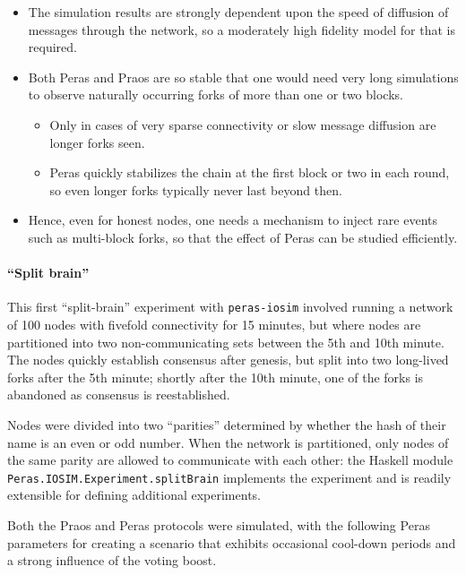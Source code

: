 \documentclass[10pt]{article}
\providecommand{\tightlist}{%
  \setlength{\itemsep}{0pt}\setlength{\parskip}{0pt}}
\begin{document}
\begin{itemize}
\tightlist
\item
  The simulation results are strongly dependent upon the speed of
  diffusion of messages through the network, so a moderately high
  fidelity model for that is required.
\item
  Both Peras and Praos are so stable that one would need very long
  simulations to observe naturally occurring forks of more than one or
  two blocks.

  \begin{itemize}
  \tightlist
  \item
    Only in cases of very sparse connectivity or slow message diffusion
    are longer forks seen.
  \item
    Peras quickly stabilizes the chain at the first block or two in each
    round, so even longer forks typically never last beyond then.
  \end{itemize}
\item
  Hence, even for honest nodes, one needs a mechanism to inject rare
  events such as multi-block forks, so that the effect of Peras can be
  studied efficiently.
\end{itemize}

\paragraph{``Split brain''}\label{split-brain}

This first ``split-brain'' experiment with \texttt{peras-iosim} involved
running a network of 100 nodes with fivefold connectivity for 15
minutes, but where nodes are partitioned into two non-communicating sets
between the 5th and 10th minute. The nodes quickly establish consensus
after genesis, but split into two long-lived forks after the 5th minute;
shortly after the 10th minute, one of the forks is abandoned as
consensus is reestablished.

Nodes were divided into two ``parities'' determined by whether the hash
of their name is an even or odd number. When the network is partitioned,
only nodes of the same parity are allowed to communicate with each
other: the Haskell module \texttt{Peras.IOSIM.Experiment.splitBrain}
implements the experiment and is readily extensible for defining
additional experiments.

Both the Praos and Peras protocols were simulated, with the following
Peras parameters for creating a scenario that exhibits occasional
cool-down periods and a strong influence of the voting boost.
\end{document}
